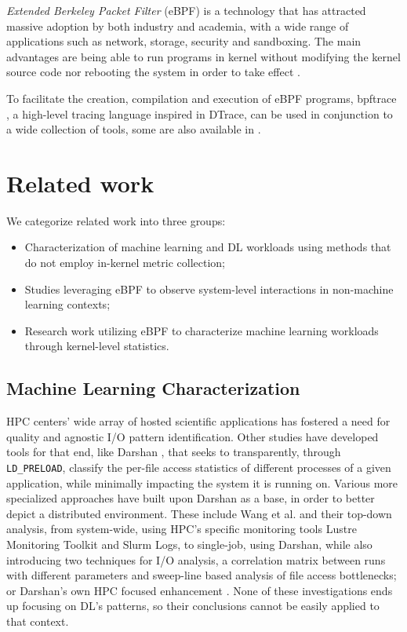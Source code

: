\documentclass[conference]{IEEEtran}
\begin{document}
\textit{Extended Berkeley Packet Filter} (eBPF) is a technology that has attracted massive adoption by both industry and academia, with a wide range of applications such as network, storage, security and sandboxing.
The main advantages are being able to run programs in kernel without modifying the kernel source code nor rebooting the system in order to take effect \cite{eBPFSurvey}.

To facilitate the creation, compilation and execution of eBPF programs, bpftrace \cite{bpftrace}, a high-level tracing language inspired in DTrace, can be used in conjunction to a wide collection of tools, some are also available in \cite{bgreggBook}.

\section{Related work}

We categorize related work into three groups:
\begin{itemize}
	\item Characterization of machine learning and DL workloads using methods that do not employ in-kernel metric collection;
	\item Studies leveraging eBPF to observe system-level interactions in non-machine learning contexts;
	\item Research work utilizing eBPF to characterize machine learning workloads through kernel-level statistics.
\end{itemize}

\subsection{Machine Learning Characterization}

HPC centers' wide array of hosted scientific applications has fostered a need for quality and agnostic I/O pattern identification. Other studies have developed tools for that end, like Darshan \cite{HPCIO24/7}, that seeks to transparently, through \texttt{LD\_PRELOAD}, classify the per-file access statistics of different processes of a given application, while minimally impacting the system it is running on. Various more specialized approaches have built upon Darshan as a base, in order to better depict a distributed environment. These include Wang et al. \cite{zoomin} and their top-down analysis, from system-wide, using HPC's specific monitoring tools Lustre Monitoring Toolkit and Slurm Logs, to single-job, using Darshan, while also introducing two techniques for I/O analysis, a correlation matrix between runs with different parameters and sweep-line based analysis of file access bottlenecks; or Darshan's own HPC focused enhancement \cite{HPCIODarshan}. None of these investigations ends up focusing on DL's patterns, so their conclusions cannot be easily applied to that context.
\end{document}

